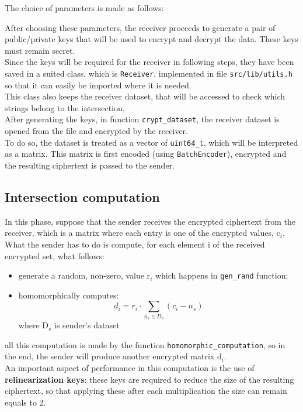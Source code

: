 \documentclass[10pt]{extarticle}
\begin{document}
The choice of parameters is made as follows:

After choosing these parameters, the receiver proceeds to generate a pair of public/private keys that will be used to encrypt and decrypt the data. These keys must remain secret.\\
Since the keys will be required for the receiver in following steps, they have been saved in a suited class, which is \texttt{Receiver}, implemented in file \texttt{src/lib/utils.h} so that it can easily be imported where it is needed.\\This class also keeps the receiver dataset, that will be accessed to check which strings belong to the intersection.\\
After generating the keys, in function \texttt{crypt\_dataset}, the receiver dataset is opened from the file and encrypted by the receiver.\\To do so, the dataset is treated as a vector of \texttt{uint64\_t}, which will be interpreted as a matrix. This matrix is first encoded (using \texttt{BatchEncoder}), encrypted and the resulting ciphertext is passed to the sender.

\subsection{Intersection computation}
In this phase, suppose that the sender receives the encrypted ciphertext from the receiver, which is a matrix where each entry is one of the encrypted values, c$_i$.\\What the sender has to do is compute, for each element i of the received encrypted set, what follows:
\begin{itemize}
    \item generate a random, non-zero, value r$_i$ which happens in \texttt{gen\_rand} function;
    \item homomorphically computes:
        \begin{equation}
            d_i = r_i \cdot \sum\limits_{n_s \in D_s} (c_i - n_s)
        \end{equation}
    where D$_s$ is sender's dataset
\end{itemize}
all this computation is made by the function \texttt{homomorphic\_computation}, so in the end, the sender will produce another encrypted matrix d$_i$.\\
An important aspect of performance in this computation is the use of \textbf{relinearization keys}: these keys are required to reduce the size of the resulting ciphertext, so that applying these after each multiplication the size can remain equals to 2.
\end{document}

